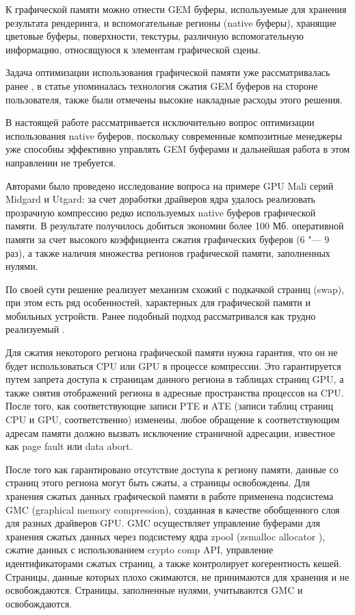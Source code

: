 \documentclass[10pt, a5paper]{article}
\begin{document}
К графической памяти можно отнести GEM буферы, используемые для хранения результата рендеринга, и вспомогательные регионы (native буферы), хранящие цветовые буферы, поверхности, текстуры, различную вспомогательную информацию, относящуюся к элементам графической сцены.

Задача оптимизации использования графической памяти уже рассматривалась ранее \footnotemark[1], в статье упоминалась технология сжатия GEM буферов на стороне пользователя, также были отмечены высокие накладные расходы этого решения.

В настоящей работе рассматривается исключительно вопрос оптимизации использования native буферов, поскольку современные композитные менеджеры уже способны эффективно управлять \linebreak GEM буферами и дальнейшая работа в этом направлении не требуется.

Авторами было проведено исследование вопроса на примере \linebreak GPU Mali серий Midgard и Utgard: за счет доработки драйверов ядра удалось реализовать прозрачную компрессию редко используемых native буферов графической памяти. В результате получилось добиться экономии более 100 Мб. оперативной памяти за счет высокого коэффициента сжатия графических буферов (6 "--- 9 раз), а также наличия множества регионов графической памяти, заполненных нулями.

По своей сути решение реализует механизм схожий с подкачкой страниц (swap), при этом есть ряд особенностей, характерных для графической памяти и мобильных устройств. Ранее подобный подход рассматривался как трудно реализуемый \footnotemark[2].

Для сжатия некоторого региона графической памяти нужна гарантия, что он не будет использоваться CPU или GPU в процессе компрессии. Это гарантируется путем запрета доступа к страницам данного региона в таблицах страниц GPU, а также снятия отображений региона в адресные пространства процессов на CPU. После того, как соответствующие записи PTE и ATE (записи таблиц страниц CPU и GPU, соответственно) изменены, любое обращение к соответствующим адресам памяти должно вызвать исключение страничной адресации, известное как page fault или data abort.

После того как гарантировано отсутствие доступа к региону памяти, данные со страниц этого региона могут быть сжаты, а страницы освобождены. Для хранения сжатых данных графической памяти в работе применена подсистема GMC (graphical memory compression), созданная в качестве обобщенного слоя для разных драйверов GPU. GMC осуществляет управление буферами для хранения сжатых данных через подсистему ядра zpool (zsmalloc \linebreak allocator \footnotemark[3]), сжатие данных с использованием crypto comp API, управление идентификаторами сжатых страниц, а также контролирует когерентность кешей. Страницы, данные которых плохо сжимаются, не принимаются для хранения и не освобождаются. Страницы, заполненные нулями, учитываются GMC и освобождаются.
\end{document}
